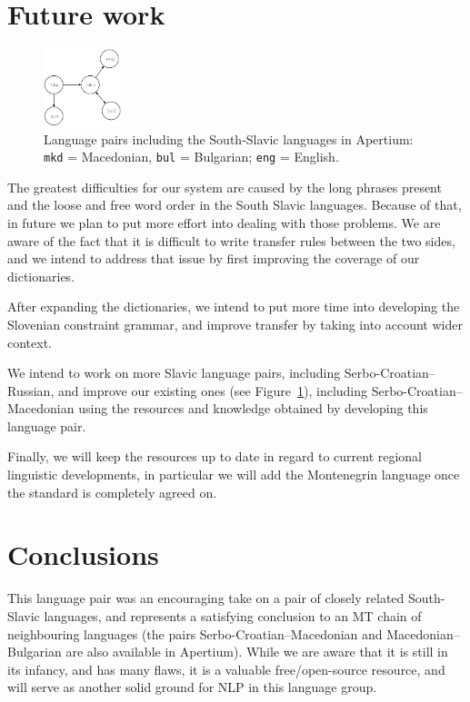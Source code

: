 \section{Future work}
\begin{figure}
\centering
\includegraphics[width=0.2\textwidth]{images/south-slavic-apertium}
\caption{Language pairs including the South-Slavic languages in Apertium: \texttt{mkd} = Macedonian,
\texttt{bul} = Bulgarian; \texttt{eng} = English.}
\label{fig:pairs}
\end{figure}

The greatest difficulties for our system are caused by the long phrases present 
and the loose and free word order in the South Slavic languages.
Because of that, in future we plan to put more effort into dealing with those problems.
We are aware of the fact that it is difficult to write transfer rules between the two sides,
and we intend to address that issue by first improving the coverage of our dictionaries.

After expanding the dictionaries, we intend to put more time into developing the Slovenian constraint grammar,
and improve transfer by taking into account wider context.

We intend to work on more Slavic language pairs, including Serbo-Croatian--Russian,
and improve our existing ones (see Figure~\ref{fig:pairs}), including Serbo-Croatian--Macedonian \cite{peradin12} using the 
resources and knowledge obtained by developing this language pair.

Finally, we will keep the resources up to date in regard to current
regional linguistic developments, in particular we will add the
Montenegrin language once the standard is completely agreed on.


\section{Conclusions}

This language pair was an encouraging take on a pair of closely
related South-Slavic languages, and represents a satisfying conclusion
to an MT chain of neighbouring languages (the pairs Serbo-Croatian--Macedonian 
and Macedonian--Bulgarian are also available in Apertium). While we are aware that it
is still in its infancy, and has many flaws, it is a valuable
free/open-source resource, and will serve as another solid ground for NLP
in this language group.

